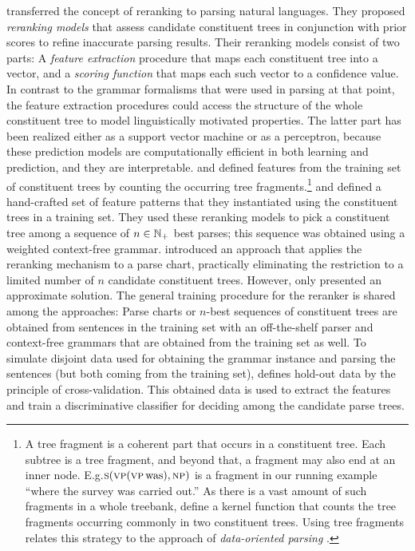 \documentclass[../document.tex]{subfiles}
\begin{document}
     transferred the concept of reranking to parsing natural languages.
    They proposed \emph{reranking models} that assess candidate constituent trees in conjunction with prior scores to refine inaccurate parsing results.
    Their reranking models consist of two parts:
        A \emph{feature extraction} procedure that maps each constituent tree into a vector, and a \emph{scoring function} that maps each such vector to a confidence value.
    In contrast to the grammar formalisms that were used in parsing at that point, the feature extraction procedures could access the structure of the whole constituent tree to model linguistically motivated properties.
    The latter part has been realized either as a support vector machine or as a perceptron, because these prediction models are computationally efficient in both learning and prediction, and they are interpretable.
     and \citet{shen2003svm} defined features from the training set of constituent trees by counting the occurring tree fragments.\footnote{
        A tree fragment is a coherent part that occurs in a constituent tree.
        Each subtree is a tree fragment, and beyond that, a fragment may also end at an inner node.
        E.g.\@ \(\textsc{s} (\textsc{vp} (\textsc{vp}\, \text{was}), \textsc{np})\) is a fragment in our running example ``where the survey was carried out.''
        As there is a vast amount of such fragments in a whole treebank, \citet{collins2001convolution} define a kernel function that counts the tree fragments occurring commonly in two constituent trees.
        Using tree fragments relates this strategy to the approach of \emph{data-oriented parsing} \citep{Bod92}.
    }
     and \citet{charniak2005coarse} defined a hand-crafted set of feature patterns that they instantiated using the constituent trees in a training set.
    They used these reranking models to pick a constituent tree among a sequence of \(n \in \mathbb{N}_+\) best parses; this sequence was obtained using a weighted context-free grammar.
     introduced an approach that applies the reranking mechanism to a parse chart, practically eliminating the restriction to a limited number of \(n\) candidate constituent trees.
    However, \citeauthor{huang2008forest} only presented an approximate solution.
    The general training procedure for the reranker is shared among the approaches:
        Parse charts or \(n\)-best sequences of constituent trees are obtained from sentences in the training set with an off-the-shelf parser and context-free grammars that are obtained from the training set as well.
        To simulate disjoint data used for obtaining the grammar instance and parsing the sentences (but both coming from the training set), \citeauthor{huang2008forest} defines hold-out data by the principle of cross-validation.
        This obtained data is used to extract the features and train a discriminative classifier for deciding among the candidate parse trees.
\end{document}
